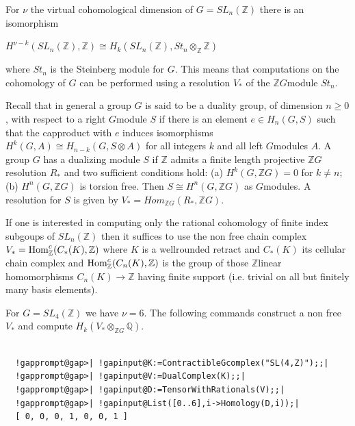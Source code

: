 \documentclass[a4paper,11pt]{report}
\begin{document}
{{{\begin{Verbatim}[commandchars=!@|,fontsize=\small,frame=single,label=Example]
\end{Verbatim}
 For $\nu$ the virtual cohomological dimension of $G=SL_n(\mathbb Z)$ there is an isomorphism 

$H^{\nu-k}(SL_n(\mathbb Z),\mathbb Z) \cong H_k(SL_n(\mathbb Z),St_n
\otimes_{\mathbb Z} \mathbb Z)$ 

 where $St_n$ is the Steinberg module for $G$. This means that computations on the cohomology of $G$ can be performed using a resolution $V_\ast$ of the $\mathbb ZG$\texttt{}module $St_n$. 

 Recall that in general a group $G$ is said to be a duality group, of dimension $n\ge 0$, with respect to a right $G$\texttt{}module $S$ if there is an element $e\in H_n(G,S)$ such that the cap\texttt{}product with $e$ induces isomorphisms $H^k(G,A) \cong H_{n-k}(G,S\otimes A)$ for all integers $k$ and all left $G$\texttt{}modules $A$. A group $G$ has a dualizing module $S$ if $\mathbb Z$ admits a finite length projective $\mathbb ZG$\texttt{} resolution $R_\ast$ and two sufficient conditions hold: (a) $H^k(G,\mathbb ZG)=0$ for $k\ne n$; (b) $H^n(G,\mathbb ZG)$ is torsion free. Then $S\cong H^n(G,\mathbb ZG)$ as $G$\texttt{}modules. A resolution for $S$ is given by $V_\ast =Hom_{\mathbb ZG}(R_\ast,\mathbb ZG)$. 

 If one is interested in computing only the rational cohomology of finite index
subgoups of $SL_n(\mathbb Z)$ then it suffices to use the non free chain complex $V_\ast = {\rm Hom}^c_{\mathbb Z}(C_\ast(K),\mathbb Z)$ where $K$ is a well\texttt{}rounded retract and $C_\ast(K)$ its cellular chain complex and ${\rm Hom}^c_{\mathbb Z}(C_n(K),\mathbb Z)$ is the group of those $\mathbb Z$\texttt{}linear homomorphisms $C_n(K) \rightarrow \mathbb Z$ having finite support (i.e. trivial on all but finitely many basis elements). 

 For $G=SL_4(\mathbb Z)$ we have $\nu=6$. The following commands construct a non free $V_\ast$ and compute $H_k(V_\ast \otimes_{\mathbb ZG} \mathbb Q)$. 
\begin{Verbatim}[commandchars=!@|,fontsize=\small,frame=single,label=Example]
          
  !gapprompt@gap>| !gapinput@K:=ContractibleGcomplex("SL(4,Z)");;|
  !gapprompt@gap>| !gapinput@V:=DualComplex(K);;|
  !gapprompt@gap>| !gapinput@D:=TensorWithRationals(V);;|
  !gapprompt@gap>| !gapinput@List([0..6],i->Homology(D,i));|
  [ 0, 0, 0, 1, 0, 0, 1 ]
  

\end{Verbatim}}}}
\end{document}
